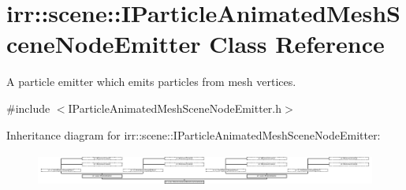 \hypertarget{classirr_1_1scene_1_1IParticleAnimatedMeshSceneNodeEmitter}{}\section{irr\+:\+:scene\+:\+:I\+Particle\+Animated\+Mesh\+Scene\+Node\+Emitter Class Reference}
\label{classirr_1_1scene_1_1IParticleAnimatedMeshSceneNodeEmitter}


A particle emitter which emits particles from mesh vertices.  




{\ttfamily \#include $<$I\+Particle\+Animated\+Mesh\+Scene\+Node\+Emitter.\+h$>$}

Inheritance diagram for irr\+:\+:scene\+:\+:I\+Particle\+Animated\+Mesh\+Scene\+Node\+Emitter\+:\begin{figure}[H]
\begin{center}
\leavevmode
\includegraphics[height=1.121795cm]{classirr_1_1scene_1_1IParticleAnimatedMeshSceneNodeEmitter}
\end{center}
\end{figure}
